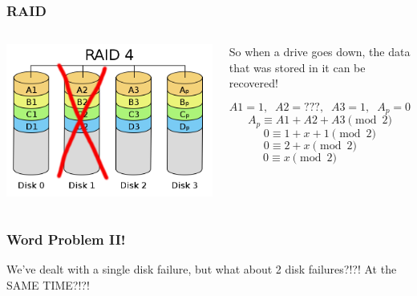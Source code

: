 \documentclass{beamer}
\theoremstyle{mystyle}
\begin{document}

\begin{frame}
\frametitle{RAID}

\begin{columns}
		\begin{center}
			\vspace{-1in}
			\includegraphics[scale=0.15]{disk1}	
		\end{center}
		\begin{center}
			So when a drive goes down, the data that was stored in it can be recovered! 
		
			\[A1 = 1, \; \; A2 = ???, \; \; A3 = 1, \;\; A_p =  0\]
		    \pause \[ A_p \equiv A1 + A2 + A3 \pmod 2 \]
		    \vspace*{-\baselineskip}\pause\[ 0 \equiv 1 + x + 1 \pmod2 \]
		    \vspace*{-\baselineskip}\pause\[ \; 0 \equiv 2 + x \pmod 2 \quad \quad \]
		   \vspace*{-\baselineskip} \pause \[ 0 \equiv x \pmod 2 \quad \quad \quad \;\; \]
		\end{center}
\end{columns}
 
\end{frame}

\begin{frame}
\frametitle{Word Problem II!}

	\begin{center}
		We've dealt with a single disk failure, but what about 2 disk failures?!?! At the SAME TIME?!?!
	\end{center}
	
\end{frame}
\end{document}

